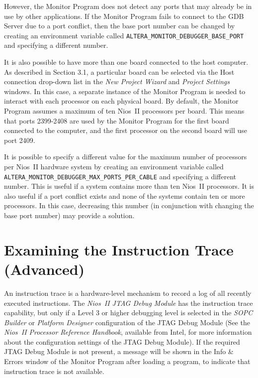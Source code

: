 \documentclass[11pt, twoside, pdftex]{article}
\begin{document}
However, the Monitor Program does not detect any ports that may
already be in use by other applications. If the Monitor Program
fails to connect to the GDB Server due to a port conflict, then
the base port number can be changed by creating an environment
variable called \texttt{ALTERA\_MONITOR\_DEBUGGER\_BASE\_PORT}
and specifying a different number.

It is also possible to have more than one board connected to
the host computer. As described in Section 3.1, a particular
board can be selected via the \textsf{Host connection} drop-down
list in the {\it New Project Wizard} and {\it Project Settings}
windows. In this case, a separate instance of the Monitor
Program is needed to interact with each processor on each
physical board. By default, the Monitor Program assumes a
maximum of ten Nios~II processors per board. This means that
ports 2399-2408 are used by the Monitor Program for the first
board connected to the computer, and the first processor on the
second board will use port 2409.

It is possible to specify a different value for the maximum
number of processors per Nios~II hardware system by creating an
environment variable called 
\texttt{ALTERA\_MONITOR\_DEBUGGER\_MAX\_PORTS\_PER\_CABLE} and
specifying a different number. 
This is useful if a system contains more than ten Nios~II
processors. It is also useful if a port conflict exists and none
of the systems contain ten or more processors. In this case,
decreasing this number (in conjunction with changing the base
port number) may provide a solution.

\newpage
\section{Examining the Instruction Trace (Advanced)}

An instruction trace is a hardware-level mechanism to record a
log of all recently executed instructions. 
The \emph{Nios~II JTAG Debug Module} has the instruction trace
capability, but only if a Level 3 or higher debugging level
is selected in the \emph{SOPC Builder} or \emph{Platform Designer}
configuration of the JTAG Debug Module 
(See the \emph{Nios~II Processor Reference Handbook},
available from Intel, for more information about the
configuration settings of the JTAG Debug Module). If the 
required JTAG Debug Module is not present, a message will be
shown in the \textsf{Info \& Errors} window of the Monitor
Program after loading a program, to indicate that instruction
trace is not available.
\end{document}
